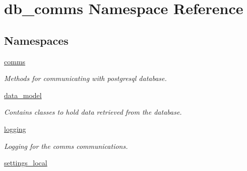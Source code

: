 \hypertarget{namespacedb__comms}{}\section{db\+\_\+comms Namespace Reference}
\label{namespacedb__comms}
\subsection*{Namespaces}
\begin{DoxyCompactItemize}
\item 
 \hyperlink{namespacedb__comms_1_1comms}{comms}
\begin{DoxyCompactList}\small\item\em Methods for communicating with postgresql database. \end{DoxyCompactList}\item 
 \hyperlink{namespacedb__comms_1_1data__model}{data\+\_\+model}
\begin{DoxyCompactList}\small\item\em Contains classes to hold data retrieved from the database. \end{DoxyCompactList}\item 
 \hyperlink{namespacedb__comms_1_1logging}{logging}
\begin{DoxyCompactList}\small\item\em Logging for the comms communications. \end{DoxyCompactList}\item 
 \hyperlink{namespacedb__comms_1_1settings__local}{settings\+\_\+local}
\end{DoxyCompactItemize}
